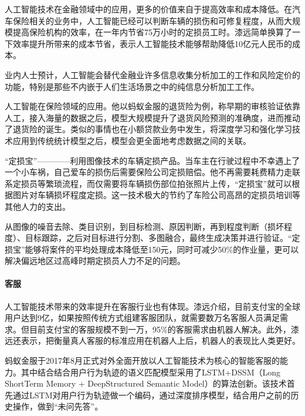 \documentclass[letterpaper,11pt,english]{sphinxmanual}
\begin{document}
人工智能技术在金融领域中的应用，更多的价值来自于提高效率和成本降低。在汽车保险相关的业务中，人工智能已经可以判断车辆的损伤和可修复程度，从而大规模提高保险机构的效率，在一年内节省75万小时的定损员工时。漆远简单换算了一下效率提升所带来的成本节省，表示人工智能技术能够帮助降低10亿元人民币的成本。

业内人士预计，人工智能会替代金融业许多信息收集分析加工的工作和风险定价的功能，特别是那些不内嵌于人们生活场景之中的纯信息分析加工工作。%
\begin{footnote}[304]\sphinxAtStartFootnote
{}
%
\end{footnote}

人工智能在保险领域的应用。他以蚂蚁金服的退货险为例，称早期的审核验证依靠人工，接入海量的数据之后，模型大规模提升了退货风险预测的准确度，进而推动了退货险的诞生。类似的事情也在小额贷款业务中发生，将深度学习和强化学习技术应用到传统统计模型之后，模型会更全面地考虑数据之间的关联。

“定损宝”————利用图像技术的车辆定损产品。当车主在行驶过程中不幸遇上了一个小车祸，自己爱车的损伤后需要保险公司定损赔偿。他不再需要耗费精力走联系定损员等繁琐流程，而仅需要将车辆损伤部位拍张照片上传，“定损宝”就可以根据图片对车辆损坏程度定损。这一技术极大的节约了车险公司高昂的定损员培训等其他人力的支出。

从图像的噪音去除、类目识别，到目标检测、原因判断，再到程度判断（损坏程度）、目标跟踪，之后对目标进行分割、多图融合，最终生成决策并进行验证。“定损宝”能够将案件的平均处理成本降低至150元，同时可减少50\%的作业量，更可以解决偏远地区过高峰时期定损员人力不足的问题。%
\begin{footnote}[305]\sphinxAtStartFootnote
{}
%
\end{footnote}


\paragraph{客服}
\label{\detokenize{chapter_dive/qi_yuan:id6}}
人工智能技术带来的效率提升在客服行业也有体现。漆远介绍，目前支付宝的全球用户达到9亿，如果按照传统方式组建客服团队，就需要数万名客服人员满足需求。但目前支付宝的客服规模不到一万，95\%的客服需求由机器人解决。此外，漆远还表示，把衡量真人客服的标准应用在机器人上后，机器人的表现比人类更好。

蚂蚁金服于2017年8月正式对外全面开放以人工智能技术为核心的智能客服的能力。其中结合结合用户行为轨迹的语义匹配模型采用了LSTM+DSSM（Long
Short\sphinxhyphen{}Term Memory + DeepStructured Semantic
Model）的算法创新。该技术首先通过LSTM对用户行为轨迹做一个编码，通过深度排序模型，结合用户之前的历史操作，做到“未问先答”。
\end{document}
